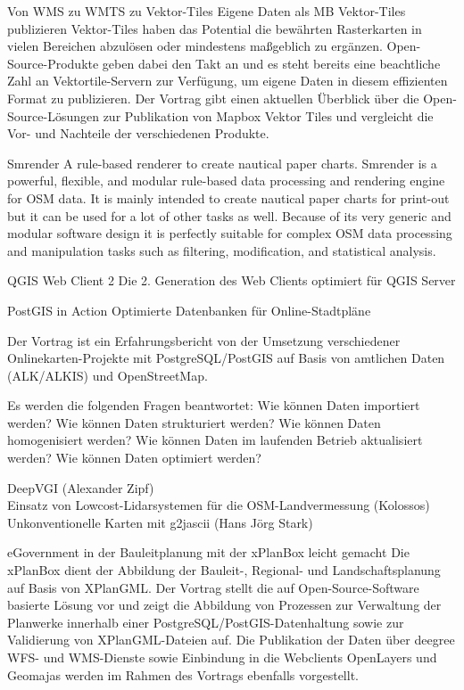 %
{Von WMS zu WMTS zu Vektor-Tiles}%
{Eigene Daten als MB Vektor-Tiles publizieren}%
{Vektor-Tiles haben das Potential die bewährten
Rasterkarten in vielen Bereichen abzulösen oder mindestens maßgeblich zu ergänzen.
Open-Source-Produkte geben dabei den Takt an und es steht bereits eine beachtliche Zahl an
Vektortile-Servern zur Verfügung, um eigene Daten in diesem effizienten Format zu publizieren. Der
Vortrag gibt einen aktuellen Überblick über die Open-Source-Lösungen zur Publikation von Mapbox
Vektor Tiles und vergleicht die Vor- und Nachteile der verschiedenen Produkte. }

%
{Smrender}%
{A rule-based renderer to create nautical paper charts.}%
{Smrender is a powerful, flexible, and modular rule-based data processing and rendering engine for
OSM data. It is mainly intended to create nautical paper charts for print-out but it can be used for
a lot of other tasks as well. Because of its very generic and modular software design it is
perfectly suitable for complex OSM data processing and manipulation tasks such as filtering,
modification, and statistical analysis.}


%
{QGIS Web Client 2}%
{Die 2. Generation des Web Clients optimiert für QGIS Server}%
{}

%
{PostGIS in Action}%
{Optimierte Datenbanken für Online-Stadtpläne}%
{Der Vortrag ist ein Erfahrungsbericht von der Umsetzung verschiedener Onlinekarten-Projekte mit
  PostgreSQL/PostGIS auf Basis von amtlichen Daten (ALK/ALKIS) und OpenStreetMap. 

Es werden die folgenden Fragen beantwortet: Wie können Daten importiert werden? Wie können Daten
strukturiert werden? Wie können Daten homogenisiert werden? Wie können Daten im laufenden Betrieb
aktualisiert werden? Wie können Daten optimiert werden?}

%
{DeepVGI (Alexander Zipf)\\
Einsatz von Lowcost-Lidarsystemen für die OSM-Landvermessung (Kolossos)\\
Unkonventionelle Karten mit g2jascii (Hans Jörg Stark)}


%
{eGovernment in der Bauleitplanung mit der xPlanBox leicht gemacht}%
{}%
{Die xPlanBox dient der Abbildung der Bauleit-, Regional- und Landschaftsplanung auf Basis von
XPlanGML. Der Vortrag stellt die auf Open-Source-Software basierte Lösung vor und zeigt die
Abbildung von Prozessen zur Verwaltung der Planwerke innerhalb einer PostgreSQL/PostGIS-Datenhaltung
sowie zur Validierung von XPlanGML-Dateien auf. Die Publikation der Daten über deegree WFS- und
WMS-Dienste sowie Einbindung in die Webclients OpenLayers und Geomajas werden im Rahmen des Vortrags
ebenfalls vorgestellt.}

